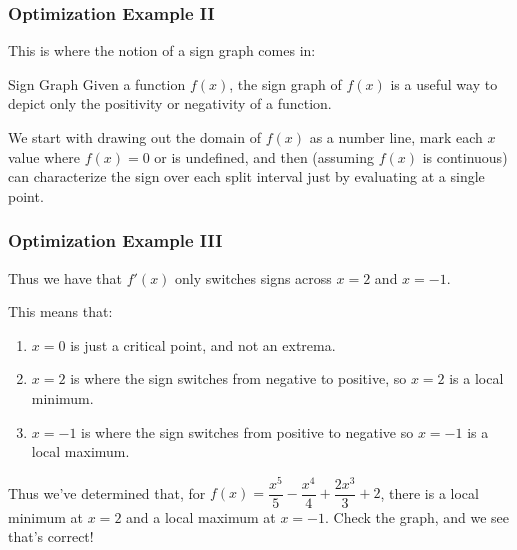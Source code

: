 \documentclass{ltx-talk}
\begin{document}
\begin{frame}
  \frametitle{Optimization Example II}
  This is where the notion of a sign graph comes in:

  \begin{block}{Sign Graph}
    Given a function $f(x)$, the sign graph of $f(x)$ is a useful way to depict only the positivity or negativity of a function. \pause

    We start with drawing out the domain of $f(x)$ as a number line, \pause
    mark each $x$ value where $f(x) = 0$ or is undefined, \pause
    and then (assuming $f(x)$ is continuous) \pause can characterize
    the sign over each split interval just by evaluating at a single point.
  \end{block} \pause

  \vfill
\end{frame}

\begin{frame}
  \frametitle{Optimization Example III}
  Thus we have that $f'(x)$ only switches signs across $x = 2$ and $x = -1$. \pause

  This means that:
  \begin{enumerate}
    \item $x = 0$ is \pause just a critical point, and not an extrema. \pause
    \item $x = 2$ is where the sign switches from \pause negative to \pause positive, so $x = 2$ is a \pause local minimum. \pause
    \item $x = -1$ is where the sign switches from \pause positive to \pause negative so $x = -1$ is a \pause local maximum.
  \end{enumerate} \pause

  Thus we've determined that, for $f(x) = \dfrac{x^5}{5} - \dfrac{x^4}{4} + \dfrac{2x^3}{3} + 2$, there is a local minimum at $x = 2$ and a local maximum at $x = -1$. \pause Check the graph, and we see that's correct!
\end{frame}
\end{document}
